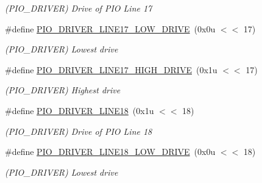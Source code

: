 \begin{DoxyCompactItemize}
\begin{DoxyCompactList}\small\item\em (P\+I\+O\+\_\+\+D\+R\+I\+V\+ER) Drive of P\+IO Line 17 \end{DoxyCompactList}\item 
\mbox{\label{group__SAME70__PIO_ga3d9d2cd987f82161d91df30e5acabb4e}} 
\#define \mbox{\hyperlink{group__SAME70__PIO_ga3d9d2cd987f82161d91df30e5acabb4e}{P\+I\+O\+\_\+\+D\+R\+I\+V\+E\+R\+\_\+\+L\+I\+N\+E17\+\_\+\+L\+O\+W\+\_\+\+D\+R\+I\+VE}}~(0x0u $<$$<$ 17)
\begin{DoxyCompactList}\small\item\em (P\+I\+O\+\_\+\+D\+R\+I\+V\+ER) Lowest drive \end{DoxyCompactList}\item 
\mbox{\label{group__SAME70__PIO_ga8ca5047f160df0ee94f507cc3b1d8cf3}} 
\#define \mbox{\hyperlink{group__SAME70__PIO_ga8ca5047f160df0ee94f507cc3b1d8cf3}{P\+I\+O\+\_\+\+D\+R\+I\+V\+E\+R\+\_\+\+L\+I\+N\+E17\+\_\+\+H\+I\+G\+H\+\_\+\+D\+R\+I\+VE}}~(0x1u $<$$<$ 17)
\begin{DoxyCompactList}\small\item\em (P\+I\+O\+\_\+\+D\+R\+I\+V\+ER) Highest drive \end{DoxyCompactList}\item 
\mbox{\label{group__SAME70__PIO_ga9a6f6b92dce05a3af8f16c6ab13046f7}} 
\#define \mbox{\hyperlink{group__SAME70__PIO_ga9a6f6b92dce05a3af8f16c6ab13046f7}{P\+I\+O\+\_\+\+D\+R\+I\+V\+E\+R\+\_\+\+L\+I\+N\+E18}}~(0x1u $<$$<$ 18)
\begin{DoxyCompactList}\small\item\em (P\+I\+O\+\_\+\+D\+R\+I\+V\+ER) Drive of P\+IO Line 18 \end{DoxyCompactList}\item 
\mbox{\label{group__SAME70__PIO_ga4a9b6ca6aaab7fc6812f83cb21393285}} 
\#define \mbox{\hyperlink{group__SAME70__PIO_ga4a9b6ca6aaab7fc6812f83cb21393285}{P\+I\+O\+\_\+\+D\+R\+I\+V\+E\+R\+\_\+\+L\+I\+N\+E18\+\_\+\+L\+O\+W\+\_\+\+D\+R\+I\+VE}}~(0x0u $<$$<$ 18)
\begin{DoxyCompactList}\small\item\em (P\+I\+O\+\_\+\+D\+R\+I\+V\+ER) Lowest drive \end{DoxyCompactList}\item 

\end{DoxyCompactItemize}
